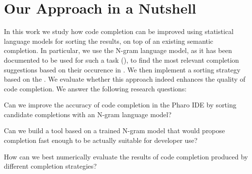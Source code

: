 
\section{Our Approach in a Nutshell}
\label{sec:Introduction-Approach}
In this work we study how code completion can be improved using statistical language models for sorting the results, on top of an existing semantic completion. In particular, we use the N-gram language model, as it has been documented to be used for such a task (\cite{Hind12a}), to find the most relevant completion suggestions based on their occurence in  . We then implement a sorting strategy based on the  . We evaluate whether this approach indeed enhances the quality of code completion. We answer the following research questions:
\begin{RQ}
    \item Can we improve the accuracy of code completion in the Pharo IDE by sorting candidate completions with an N-gram language model?
    \item Can we build a tool based on a trained N-gram model that would propose completion fast enough to be actually suitable for developer use? 
    \item How can we best numerically evaluate the results of code completion produced by different completion strategies?
\end{RQ}

